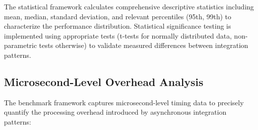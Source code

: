 The statistical framework calculates comprehensive descriptive statistics including mean, median, standard deviation, and relevant percentiles (95th, 99th) to characterize the performance distribution. Statistical significance testing is implemented using appropriate tests (t-tests for normally distributed data, non-parametric tests otherwise) to validate measured differences between integration patterns.

\subsection{Microsecond-Level Overhead Analysis}

The benchmark framework captures microsecond-level timing data to precisely quantify the processing overhead introduced by asynchronous integration patterns:


